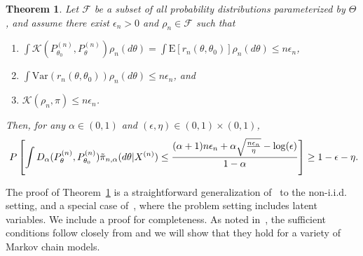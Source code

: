\documentclass[11pt]{amsart}
\newcommand{\E}{\mathrm{E}}
\newcommand{\Var}{\mathrm{Var}}
\newcommand{\kld}{ \mathcal{K}(P^{(n)}_{\theta_0},P^{(n)}_{\theta})}
\newtheorem{theorem}{Theorem}[section]
\begin{document}
\renewcommand{\theenumi}{\roman{enumi}}

\begin{theorem}\label{thm:pac-bayes}
Let $\mathcal{F}$ be a subset of all probability distributions parameterized by $\Theta$, and assume there exist $\epsilon_n >0$ and $\rho_n\in \mathcal{F}$ such that 
\begin{enumerate}[align=left,leftmargin=*]
    \item $\int \kld \rho_n(d\theta) = \int \E[r_n(\theta,\theta_0)] \rho_n(d\theta) \leq n\epsilon_n $,
    \item $\int \Var \left( r_n(\theta,\theta_0) \right)\rho_n (d\theta)\leq n\epsilon_n$, and
    \item $\mathcal{K}(\rho_n,\pi)\leq n\epsilon_n$.
\end{enumerate}
Then, for any $\alpha \in (0,1)$ and $(\epsilon, \eta) \in (0,1)\times(0,1)$,
\begin{align}~\label{eq:thm21}
    P\left[ \int  D_{\alpha}(P^{(n)}_{\theta},P^{(n)}_{\theta_0})\Tilde{\pi}_{n,\alpha}(d\theta|X^{(n)} )\leq \frac{ (\alpha+1)n\epsilon_n+\alpha\sqrt{\frac{n\epsilon_n}{\eta}}-\log(\epsilon) } {  1-\alpha}  \right]\geq 1-\epsilon-\eta.
\end{align}
\end{theorem}
The proof of Theorem~\ref{thm:pac-bayes} is a straightforward generalization of~\cite[Theorem 2.4]{pierre} to the non-i.i.d. setting,
and a special case of~\cite[Theorem 3.1]{bhatta}, where the problem setting includes latent variables. We include a proof for completeness. As noted in~\cite{pierre}, the sufficient conditions follow closely from \cite{ghoshal} and we will show that they hold for a variety of Markov chain models.
\end{document}
